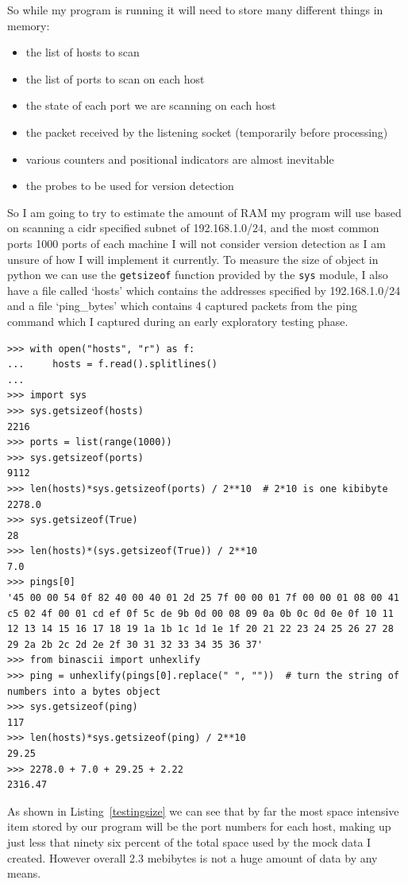 \documentclass[titlepage]{article}
\begin{document}
So while my program is running it will need to store many different things in memory:
\begin{itemize}
  \item{the list of hosts to scan}
  \item{the list of ports to scan on each host}
  \item{the state of each port we are scanning on each host}
  \item{the packet received by the listening socket (temporarily before processing)}
  \item{various counters and positional indicators are almost inevitable}
  \item{the probes to be used for version detection}
\end{itemize}
So I am going to try to estimate the amount of RAM my program will use based on scanning a 
\gls{cidr} specified subnet of 192.168.1.0/24, and the most common ports 1000 ports of each machine
I will not consider version detection as I am unsure of how I will implement it currently.
To measure the size of object in python we can use the \verb|getsizeof| function provided by the
\verb|sys| module, I also have a file called `hosts' which contains the addresses specified by
192.168.1.0/24 and a file `ping\_bytes' which contains 4 captured packets from the ping command
which I captured during an early exploratory testing phase.
\lstset{language=python}
\begin{lstlisting}[label=testingsize,caption=some testing I did on the size of python objects]
>>> with open("hosts", "r") as f:
...     hosts = f.read().splitlines()
... 
>>> import sys
>>> sys.getsizeof(hosts)
2216
>>> ports = list(range(1000))
>>> sys.getsizeof(ports)
9112
>>> len(hosts)*sys.getsizeof(ports) / 2**10  # 2*10 is one kibibyte
2278.0
>>> sys.getsizeof(True)
28
>>> len(hosts)*(sys.getsizeof(True)) / 2**10
7.0
>>> pings[0]
'45 00 00 54 0f 82 40 00 40 01 2d 25 7f 00 00 01 7f 00 00 01 08 00 41 c5 02 4f 00 01 cd ef 0f 5c de 9b 0d 00 08 09 0a 0b 0c 0d 0e 0f 10 11 12 13 14 15 16 17 18 19 1a 1b 1c 1d 1e 1f 20 21 22 23 24 25 26 27 28 29 2a 2b 2c 2d 2e 2f 30 31 32 33 34 35 36 37'
>>> from binascii import unhexlify
>>> ping = unhexlify(pings[0].replace(" ", ""))  # turn the string of numbers into a bytes object
>>> sys.getsizeof(ping)
117
>>> len(hosts)*sys.getsizeof(ping) / 2**10
29.25
>>> 2278.0 + 7.0 + 29.25 + 2.22
2316.47
\end{lstlisting}
As shown in Listing~\ref{testingsize} we can see that by far the most space intensive item stored
by our program will be the port numbers for each host, making up just less that ninety six percent
of the total space used by the mock data I created. However overall 2.3 mebibytes is not a huge
amount of data by any means.
\end{document}
